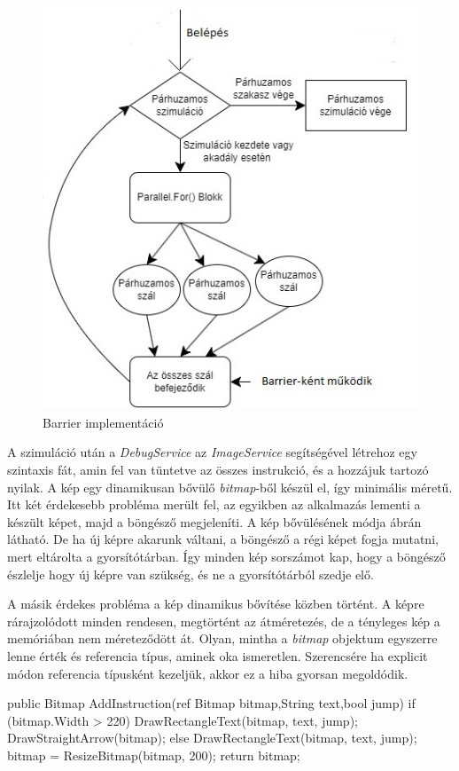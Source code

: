 \begin{figure}[h]
\centering
\includegraphics[scale=0.9]{images/Barrier.jpg}
\caption{Barrier implementáció}
\label{fig:Barrier}
\end{figure}

A szimuláció után a \textit{DebugService} az \textit{ImageService} segítségével létrehoz egy szintaxis fát, amin fel van tüntetve az összes instrukció, és a hozzájuk tartozó nyilak. A kép egy dinamikusan bővülő \textit{bitmap}-ből készül el, így minimális méretű. Itt két érdekesebb probléma merült fel, az egyikben az alkalmazás lementi a készült képet, majd a böngésző megjeleníti. A kép bővülésének módja  ábrán látható. De ha új képre akarunk váltani, a böngésző a régi képet fogja mutatni, mert eltárolta a gyorsítótárban. Így minden kép sorszámot kap, hogy a böngésző észlelje hogy új képre van szükség, és ne a gyorsítótárból szedje elő. 

A másik érdekes probléma a kép dinamikus bővítése közben történt. A képre rárajzolódott minden rendesen, megtörtént az átméretezés, de a tényleges kép a memóriában nem méreteződött át. Olyan, mintha a \textit{bitmap} objektum egyszerre lenne érték és referencia típus, aminek oka ismeretlen. Szerencsére ha explicit módon referencia típusként kezeljük, akkor ez a hiba gyorsan megoldódik.

\begin{cpp}
public Bitmap AddInstruction(ref Bitmap bitmap,String text,bool jump)
{
      if (bitmap.Width > 220)
      {
           DrawRectangleText(bitmap, text, jump);
           DrawStraightArrow(bitmap);
       }
       else
       {
           DrawRectangleText(bitmap, text, jump);
       }
       bitmap = ResizeBitmap(bitmap, 200);
       return bitmap;
}
\end{cpp}

